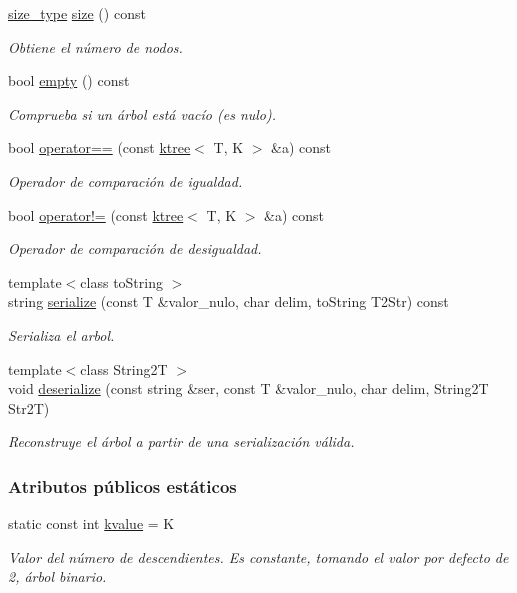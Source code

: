 \begin{DoxyCompactItemize}
\hyperlink{classktree_ac0f325d73a32ea75b8d09579c2085566}{size\+\_\+type} \hyperlink{classktree_a92ec62757b1c5e5de363926a47c34dfa}{size} () const 
\begin{DoxyCompactList}\small\item\em Obtiene el número de nodos. \end{DoxyCompactList}\item 
bool \hyperlink{classktree_a71f040bbe682e6bf70a60c88ef13e20b}{empty} () const 
\begin{DoxyCompactList}\small\item\em Comprueba si un árbol está vacío (es nulo). \end{DoxyCompactList}\item 
bool \hyperlink{classktree_acf517775ac06bfc92644204b764ed66a}{operator==} (const \hyperlink{classktree}{ktree}$<$ T, K $>$ \&a) const 
\begin{DoxyCompactList}\small\item\em Operador de comparación de igualdad. \end{DoxyCompactList}\item 
bool \hyperlink{classktree_ab346beffa74a7d80243f11b2762d2c30}{operator!=} (const \hyperlink{classktree}{ktree}$<$ T, K $>$ \&a) const 
\begin{DoxyCompactList}\small\item\em Operador de comparación de desigualdad. \end{DoxyCompactList}\item 
{\footnotesize template$<$class to\+String $>$ }\\string \hyperlink{classktree_a358f42faaa3a64d50acc63fc1556617a}{serialize} (const T \&valor\+\_\+nulo, char delim, to\+String T2\+Str) const 
\begin{DoxyCompactList}\small\item\em Serializa el arbol. \end{DoxyCompactList}\item 
{\footnotesize template$<$class String2T $>$ }\\void \hyperlink{classktree_a66d27ffb43b3c790370b45c0a8309534}{deserialize} (const string \&ser, const T \&valor\+\_\+nulo, char delim, String2T Str2T)
\begin{DoxyCompactList}\small\item\em Reconstruye el árbol a partir de una serialización válida. \end{DoxyCompactList}\end{DoxyCompactItemize}
\subsubsection*{Atributos públicos estáticos}
\begin{DoxyCompactItemize}
\item 
static const int \hyperlink{classktree_a3c639c3ca0ef80277c29ae54d7bd8d41}{kvalue} = K
\begin{DoxyCompactList}\small\item\em Valor del número de descendientes. Es constante, tomando el valor por defecto de 2, árbol binario. \end{DoxyCompactList}\end{DoxyCompactItemize}


